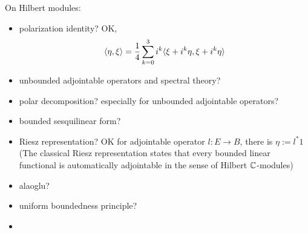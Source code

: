 \documentclass{../../large}
\begin{document}
On Hilbert modules:
\begin{itemize}
\item polarization identity? OK,
\[\langle\eta,\xi\rangle=\frac14\sum_{k=0}^3i^k\langle\xi+i^k\eta,\xi+i^k\eta\rangle\]
\item unbounded adjointable operators and spectral theory?
\item polar decomposition? especially for unbounded adjointable operators?
\item bounded sesquilinear form?
\item Riesz representation? OK for adjointable operator $l:E\to B$, there is $\eta:=l^*1$ (The classical Riesz representation states that every bounded linear functional is automatically adjointable in the sense of Hilbert $\mathbb{C}$-modules)
\item alaoglu?
\item uniform boundedness principle?
\item 
\end{itemize}
\end{document}
